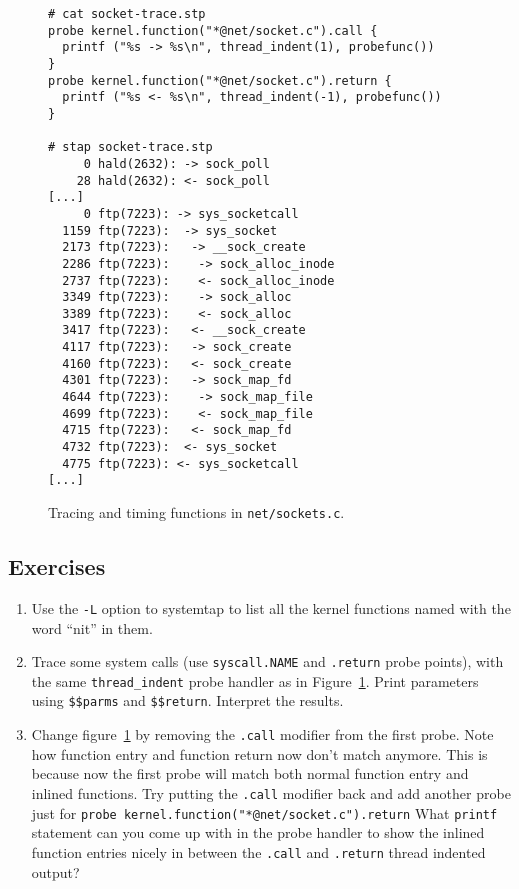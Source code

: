 \documentclass{article}
\newenvironment{boxedminipage}%
    {\begin{makeimage}\begin{center}\begin{Sbox}\begin{minipage}}%
    {\end{minipage}\end{Sbox}\fbox{\TheSbox}\end{center}\end{makeimage}}
\begin{document}
\begin{figure}[!ht]
\begin{boxedminipage}{4.5in}
\begin{verbatim}
# cat socket-trace.stp
probe kernel.function("*@net/socket.c").call {
  printf ("%s -> %s\n", thread_indent(1), probefunc())
}
probe kernel.function("*@net/socket.c").return {
  printf ("%s <- %s\n", thread_indent(-1), probefunc())
}

# stap socket-trace.stp
     0 hald(2632): -> sock_poll
    28 hald(2632): <- sock_poll
[...]
     0 ftp(7223): -> sys_socketcall
  1159 ftp(7223):  -> sys_socket
  2173 ftp(7223):   -> __sock_create
  2286 ftp(7223):    -> sock_alloc_inode
  2737 ftp(7223):    <- sock_alloc_inode
  3349 ftp(7223):    -> sock_alloc
  3389 ftp(7223):    <- sock_alloc
  3417 ftp(7223):   <- __sock_create
  4117 ftp(7223):   -> sock_create
  4160 ftp(7223):   <- sock_create
  4301 ftp(7223):   -> sock_map_fd
  4644 ftp(7223):    -> sock_map_file
  4699 ftp(7223):    <- sock_map_file
  4715 ftp(7223):   <- sock_map_fd
  4732 ftp(7223):  <- sys_socket
  4775 ftp(7223): <- sys_socketcall
[...]
\end{verbatim}
\end{boxedminipage}
\caption{Tracing and timing functions in {\tt net/sockets.c}.}
\label{fig:socket-trace}
\end{figure}

\subsection{Exercises}

\begin{enumerate}
\item Use the \verb+-L+ option to systemtap to list all the kernel
  functions named with the word ``nit'' in them.

\item Trace some system calls (use \verb+syscall.NAME+ and
  \verb+.return+ probe points), with the same \verb+thread_indent+
  probe handler as in Figure~\ref{fig:socket-trace}.  Print parameters
  using \verb+$$parms+ and \verb+$$return+.  Interpret the results.

\item Change figure~\ref{fig:socket-trace} by removing the \verb+.call+
  modifier from the first probe.  Note how function entry and function
  return now don't match anymore.  This is because now the first probe
  will match both normal function entry and inlined functions.  Try
  putting the \verb+.call+ modifier back and add another probe just for
  \verb+probe kernel.function("*@net/socket.c").return+
  What \verb+printf+ statement can you come up with in the probe handler
  to show the inlined function entries nicely in between the \verb+.call+
  and \verb+.return+ thread indented output?

\end{enumerate}
\end{document}
